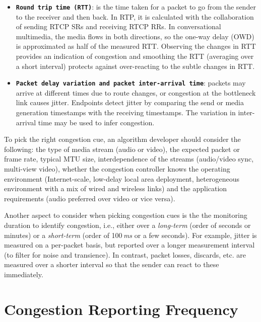 \begin{itemize}

\item \textbf{\texttt{Round trip time (RTT)}}: is the time taken for a packet
to go from the sender to the receiver and then back. In RTP, it is calculated
with the collaboration of sending RTCP SRs and receiving RTCP RRs. In
conversational multimedia, the media flows in both directions, so the one-way
delay (OWD) is approximated as half of the measured RTT. Observing the changes
in RTT provides an indication of congestion and smoothing the RTT
(averaging over a short interval) protects against over-reacting to the subtle
changes in RTT.

\item \textbf{\texttt{Packet delay variation and packet inter-arrival time}}:
packets may arrive at different times due to route changes, or congestion at
the bottleneck link causes jitter. Endpoints detect jitter by comparing the
send or media generation timestamps with the receiving timestamps. The
variation in inter-arrival time may be used to infer congestion.


\end{itemize}

To pick the right congestion cue, an algorithm developer should consider the
following: the type of media stream (audio or video), the expected packet or
frame rate, typical MTU size, interdependence of the streams (audio/video
sync, multi-view video), whether the congestion controller knows the operating environment (Internet-scale, 
low-delay local area deployment, heterogeneous environment with a mix
of wired and wireless links) and the application requirements (audio preferred
over video or vice versa).

Another aspect to consider when picking congestion cues is the the monitoring
duration to identify congestion, i.e., either over a \emph{long-term} (order
of seconds or minutes) or a \emph{short-term} (order of 100\,\emph{ms} or a
few seconds). For example, jitter is measured on a per-packet basis, but
reported over a longer measurement interval (to filter for noise and
transience). In contrast, packet losses, discards, etc. are measured over a
shorter interval so that the sender can react to these immediately.

\section{Congestion Reporting Frequency}
\label{fw.freq}

